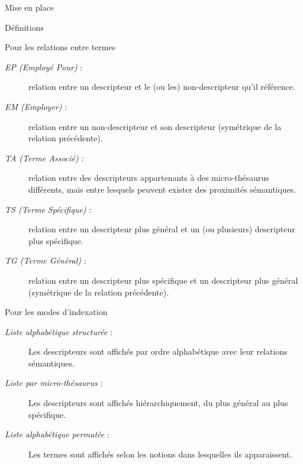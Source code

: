 \documentclass[a4paper, 12pt]{report}
\begin{document}
\begin{chapter}{Mise en place}
\begin{section}{Définitions}
		\begin{subsection}{Pour les relations entre termes}
			\label{glouglou}
			\begin{description}
				\item[\emph{EP (Employé Pour)} :] relation entre un descripteur et le (ou les) non-descripteur qu'il référence.
				\item[\emph{EM (Employer)} :] relation entre un non-descripteur et son descripteur (symétrique de la relation précédente).
				\item[\emph{TA (Terme Associé)} :] relation entre des descripteurs appartenants à des micro-thésaurus différents, mais entre lesquels peuvent exister des
				proximités sémantiques.
				\item[\emph{TS (Terme Spécifique)} :] relation entre un descripteur plus général et un (ou plusieurs) descripteur plus spécifique.
				\item[\emph{TG (Terme Général)} :] relation entre un descripteur plus spécifique et un descripteur plus général (symétrique de la relation précédente).
			\end{description}
		\end{subsection}
		
		\begin{subsection}{Pour les modes d'indexation}
			\begin{description}
				\item[\emph{Liste alphabétique structurée} :] Les descripteurs sont affichés par ordre alphabétique avec leur relations sémantiques.
				\item[\emph{Liste par micro-thésaurus} :] Les descripteurs sont affichés hiérarchiquement, du plus général au plus spécifique.
				\item[\emph{Liste alphabétique permutée} :] Les termes sont affichés selon les notions dans lesquelles ils apparaissent.
			\end{description}
		\end{subsection}
	\end{section}
\end{chapter}
\end{document}

